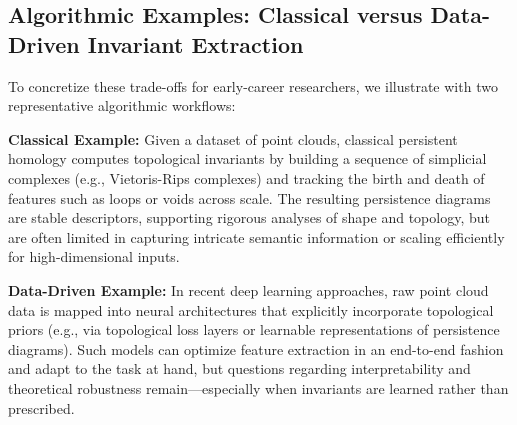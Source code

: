 \documentclass[sigconf]{acmart}
\begin{document}
\subsection*{Algorithmic Examples: Classical versus Data-Driven Invariant Extraction}

To concretize these trade-offs for early-career researchers, we illustrate with two representative algorithmic workflows:

\textbf{Classical Example:} Given a dataset of point clouds, classical persistent homology computes topological invariants by building a sequence of simplicial complexes (e.g., Vietoris-Rips complexes) and tracking the birth and death of features such as loops or voids across scale. The resulting persistence diagrams are stable descriptors, supporting rigorous analyses of shape and topology, but are often limited in capturing intricate semantic information or scaling efficiently for high-dimensional inputs.

\textbf{Data-Driven Example:} In recent deep learning approaches, raw point cloud data is mapped into neural architectures that explicitly incorporate topological priors (e.g., via topological loss layers or learnable representations of persistence diagrams). Such models can optimize feature extraction in an end-to-end fashion and adapt to the task at hand, but questions regarding interpretability and theoretical robustness remain—especially when invariants are learned rather than prescribed.
\end{document}
